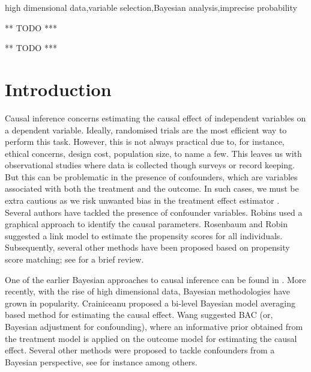 \documentclass[preprint,12pt]{elsarticle}
\begin{document}
\begin{frontmatter}
\begin{keyword}
  high dimensional data\sep variable selection\sep Bayesian analysis\sep imprecise probability
\end{keyword}

\begin{highlights}
\item *** TODO ***
\item *** TODO ***
\end{highlights}

\end{frontmatter}


\section{Introduction}\label{sec:intro}

Causal inference concerns estimating the causal
effect of independent variables on a dependent variable. Ideally,
randomised trials are the most efficient way to perform this task.
However, this is not always practical due to, for instance, ethical 
concerns, design cost, population size, to name a few. This
leaves us with observational studies
where data is collected though surveys or record keeping. But this
can be problematic in the presence of confounders, which are variables associated with both the treatment and the outcome.
In such cases, we must be extra cautious as we risk
unwanted bias in the treatment effect estimator \cite{rosenbaum83}.
Several authors have tackled the presence of
confounder variables. 
Robins \cite{Robins1986ANA} used a graphical
approach to identify the causal parameters.
Rosenbaum and Robin \cite{rosenbaum1985} suggested a link model to estimate
the propensity scores for all individuals. Subsequently, several other
methods have been proposed based on propensity score matching;
see \cite{winship99,stuart10} for a brief review.

One of the earlier Bayesian approaches to causal inference
can be found in \cite{rubin1978}. More recently,
with the rise of high dimensional data,
Bayesian methodologies have grown in popularity.
Crainiceanu \cite{Crainiceanu2008} proposed a bi-level 
Bayesian model averaging based method for estimating the causal 
effect. Wang \cite{wang2015} suggested BAC (or, Bayesian adjustment for
confounding),
where an informative prior obtained from
the treatment model is applied on the outcome model for
estimating the causal effect. Several other methods were
proposed to tackle confounders from a Bayesian perspective,
see for instance \cite{Zigler2014,Hahn2018} among others.
\end{document}
